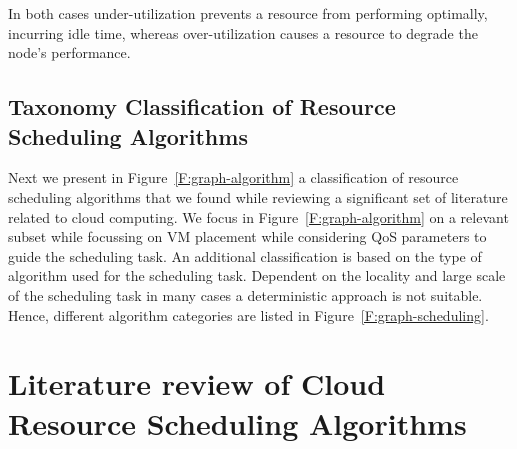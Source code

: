 \documentclass[final,5p,times,twocolumn]{elsarticle}
\begin{document}
In both cases under-utilization prevents a resource from performing
optimally, incurring idle time, whereas over-utilization causes a
resource to degrade the node's performance.





\subsection{Taxonomy Classification of Resource Scheduling Algorithms}\label{S:algo}

Next we present in Figure~\ref{F:graph-algorithm} a classification of
resource scheduling algorithms that we found while reviewing a
significant set of literature related to cloud computing. We focus in
Figure~\ref{F:graph-algorithm} on a relevant subset while focussing on
VM placement while considering QoS parameters to guide the scheduling
task. An additional classification is based on the type of algorithm
used for the scheduling task.  Dependent on the locality and large
scale of the scheduling task in many cases a deterministic approach is
not suitable. Hence, different algorithm categories are listed in
Figure~\ref{F:graph-scheduling}.










\section{Literature review of Cloud Resource Scheduling Algorithms}\label{sec:literature}
\end{document}
